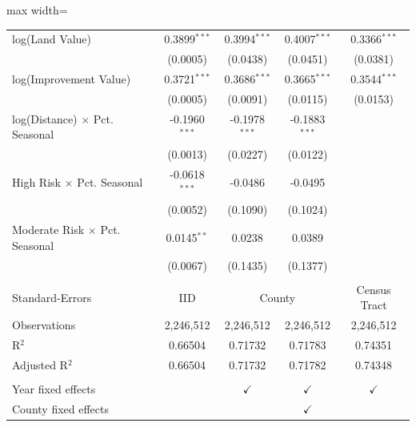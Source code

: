 \begin{table}[tp]
\begin{adjustbox}{max width=\textwidth}
\begin{tabular}{lcccc}
      log(Land Value)                       & 0.3899$^{***}$          & 0.3994$^{***}$  & 0.4007$^{***}$   & 0.3366$^{***}$\\   
                                            & (0.0005)                & (0.0438)        & (0.0451)         & (0.0381)\\   
      log(Improvement Value)                & 0.3721$^{***}$          & 0.3686$^{***}$  & 0.3665$^{***}$   & 0.3544$^{***}$\\   
                                            & (0.0005)                & (0.0091)        & (0.0115)         & (0.0153)\\   
      log(Distance) $\times$ Pct. Seasonal  & -0.1960$^{***}$         & -0.1978$^{***}$ & -0.1883$^{***}$  &   \\   
                                            & (0.0013)                & (0.0227)        & (0.0122)         &   \\   
      High Risk $\times$ Pct. Seasonal      & -0.0618$^{***}$         & -0.0486         & -0.0495          &   \\   
                                            & (0.0052)                & (0.1090)        & (0.1024)         &   \\   
      Moderate Risk $\times$ Pct. Seasonal  & 0.0145$^{**}$           & 0.0238          & 0.0389           &   \\   
                                            & (0.0067)                & (0.1435)        & (0.1377)         &   \\   
       \\
      Standard-Errors & IID & \multicolumn{2}{c}{County} & Census Tract \\ 
      Observations                          & 2,246,512               & 2,246,512       & 2,246,512        & 2,246,512\\  
      R$^2$                                 & 0.66504                 & 0.71732         & 0.71783          & 0.74351\\  
      Adjusted R$^2$                        & 0.66504                 & 0.71732         & 0.71782          & 0.74348\\  
       \\
      Year fixed effects                    &                         & $\checkmark$    & $\checkmark$     & $\checkmark$\\   
      County fixed effects                  &                         &                 & $\checkmark$     & \\  

\end{tabular}
\end{adjustbox}
\end{table}
